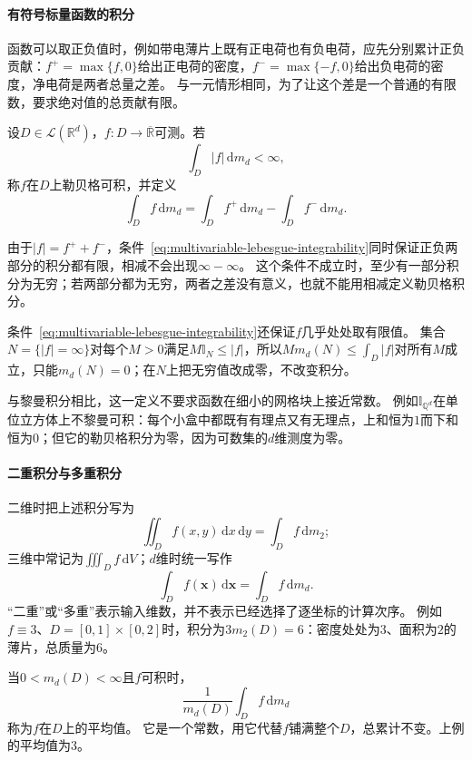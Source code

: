 \paragraph{有符号标量函数的积分}

函数可以取正负值时，例如带电薄片上既有正电荷也有负电荷，应先分别累计正负贡献：$f^+=\max\{f,0\}$给出正电荷的密度，$f^-=\max\{-f,0\}$给出负电荷的密度，净电荷是两者总量之差。
与一元情形相同，为了让这个差是一个普通的有限数，要求绝对值的总贡献有限。
\begin{definition}[区域上可测函数的积分]
设$D\in\mathcal L(\mathbb R^d)$，$f:D\to\overline{\mathbb R}$可测。若
\begin{equation}
 \int_D|f|\,\mathrm dm_d<\infty,
 \label{eq:multivariable-lebesgue-integrability}
\end{equation}
称$f$在$D$上勒贝格可积，并定义
\[
 \int_Df\,\mathrm dm_d=\int_Df^+\,\mathrm dm_d-\int_Df^-\,\mathrm dm_d.
\]
\end{definition}

由于$|f|=f^++f^-$，条件~\eqref{eq:multivariable-lebesgue-integrability}同时保证正负两部分的积分都有限，相减不会出现$\infty-\infty$。
这个条件不成立时，至少有一部分积分为无穷；若两部分都为无穷，两者之差没有意义，也就不能用相减定义勒贝格积分。

条件~\eqref{eq:multivariable-lebesgue-integrability}还保证$f$几乎处处取有限值。
集合$N=\{|f|=\infty\}$对每个$M>0$满足$M\mathbb I_N\leq|f|$，所以$Mm_d(N)\leq\int_D|f|$对所有$M$成立，只能$m_d(N)=0$；在$N$上把无穷值改成零，不改变积分。

与黎曼积分相比，这一定义不要求函数在细小的网格块上接近常数。
例如$\mathbb I_{\mathbb Q^d}$在单位立方体上不黎曼可积：每个小盒中都既有有理点又有无理点，上和恒为$1$而下和恒为$0$；但它的勒贝格积分为零，因为可数集的$d$维测度为零。

\paragraph{二重积分与多重积分}

二维时把上述积分写为
\[
 \iint_Df(x,y)\,\mathrm dx\,\mathrm dy=\int_Df\,\mathrm dm_2;
\]
三维中常记为$\iiint_Df\,\mathrm dV$；$d$维时统一写作
\[
 \int_Df(\bm x)\,\mathrm d\bm x=\int_Df\,\mathrm dm_d.
\]
“二重”或“多重”表示输入维数，并不表示已经选择了逐坐标的计算次序。
例如$f\equiv3$、$D=[0,1]\times[0,2]$时，积分为$3m_2(D)=6$：密度处处为$3$、面积为$2$的薄片，总质量为$6$。

当$0<m_d(D)<\infty$且$f$可积时，
\[
 \frac{1}{m_d(D)}\int_Df\,\mathrm dm_d
\]
称为$f$在$D$上的平均值。
它是一个常数，用它代替$f$铺满整个$D$，总累计不变。上例的平均值为$3$。

